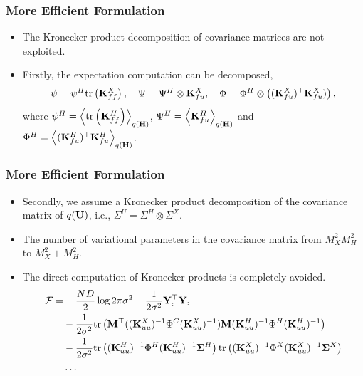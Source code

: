 \documentclass[aspectratio=169]{beamer}
\newcommand{\K}{\covarianceMatrix}
\newcommand{\yM}{\dataMatrix}
\newcommand{\uM}{\inducingMatrix}
\newcommand{\mM}{\mathbf M}
\newcommand{\hM}{\mathbf H}
\newcommand{\sM}{\mathbf \Sigma}
\begin{document}
    \begin{frame}
    \frametitle{More Efficient Formulation}
    \begin{itemize}
    \item The Kronecker product decomposition of covariance matrices are not exploited.
    \item Firstly, the expectation computation can be decomposed,
\begin{equation}
\psi =  \psi^H \tr{\K^X_{ff}}, \quad
\Psi = \Psi^H \otimes \K^X_{fu}, \quad
\Phi = \Phi^H \otimes \left((\K^X_{fu})^\top \K^X_{fu}) \right),
\end{equation}
where $\psi^H = \expectationDist{\tr{\K^H_{ff}}}{q(\hM)}$, $\Psi^H = \expectationDist{\K^H_{fu}}{q(\hM)}$ and $\Phi^H = \expectationDist{(\K^H_{fu})^\top\K^H_{fu}}{q(\hM)}$.
  \end{itemize}
  \end{frame}
  
      \begin{frame}
    \frametitle{More Efficient Formulation}
    \begin{itemize}
    \item Secondly, we assume a Kronecker product decomposition of the covariance matrix of $q(\uM)$, i.e., $\Sigma^U = \Sigma^H \otimes \Sigma^X$.
    \item The number of variational parameters in the covariance matrix from $M_X^2M_H^2$ to $M_X^2 + M_H^2$.
    \item The direct computation of Kronecker products is completely avoided.
   \begin{align*}
\mathcal{F}
=& -\frac{ND}{2}\log 2\pi \sigma^2 -\frac{1}{2\sigma^2} \yM_:^\top\yM_: \\
&-\frac{1}{2\sigma^2}\tr{ \mM^\top ((\K_{uu}^X)^{-1} \Phi^C (\K_{uu}^X)^{-1}) \mM (\K_{uu}^H)^{-1} \Phi^H (\K_{uu}^H)^{-1} }\nonumber \\
 &-\frac{1}{2\sigma^2}\tr{ (\K_{uu}^H)^{-1} \Phi^H (\K_{uu}^H)^{-1} \sM^{H} } \tr{ (\K_{uu}^X)^{-1} \Phi^X (\K_{uu}^X)^{-1} \sM^{X}} \nonumber \\
& \ldots
\end{align*}
  \end{itemize}
  \end{frame}
  
\end{document}
